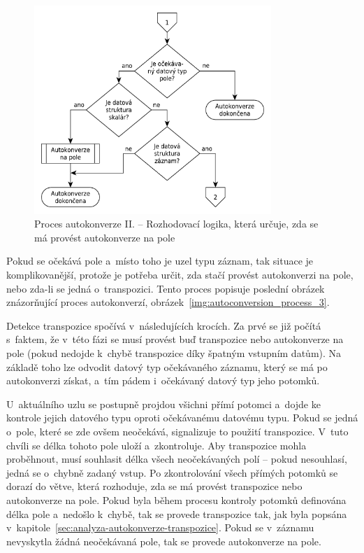 \documentclass[FM,bw,DP]{tulthesis}
\begin{document}
\begin{figure}[h]
	\centering
    \includegraphics[width=0.8\textwidth]{../img/autoconversion_process_2.pdf}
    \caption[Proces autokonverze II.]{Proces autokonverze II. -- Rozhodovací logika, která určuje, zda se má provést autokonverze na pole}
	\label{img:autoconversion_process_2}
\end{figure}

Pokud se očekává pole a~místo toho je uzel typu záznam, tak situace je komplikovanější, protože je potřeba určit, zda stačí provést autokonverzi na pole, nebo zda-li se jedná o~transpozici. Tento proces popisuje poslední obrázek znázorňující proces autokonverzí, obrázek~\ref{img:autoconversion_process_3}.

Detekce transpozice spočívá v~následujících krocích. Za prvé se již počítá s~faktem, že v~této fázi se musí provést buď transpozice nebo autokonverze na pole (pokud nedojde k~chybě transpozice díky špatným vstupním datům). Na základě toho lze odvodit datový typ očekávaného záznamu, který se má po autokonverzi získat, a~tím pádem i~očekávaný datový typ jeho potomků.

U~aktuálního uzlu se postupně projdou všichni přímí potomci a~dojde ke kontrole jejich datového typu oproti očekávanému datovému typu. Pokud se jedná o~pole, které se zde ovšem neočekává, signalizuje to použití transpozice. V~tuto chvíli se délka tohoto pole uloží a~zkontroluje. Aby transpozice mohla proběhnout, musí souhlasit délka všech neočekávaných polí -- pokud nesouhlasí, jedná se o~chybně zadaný vstup. Po zkontrolování všech přímých potomků se dorazí do větve, která rozhoduje, zda se má provést transpozice nebo autokonverze na pole. Pokud byla během procesu kontroly potomků definována délka pole a~nedošlo k~chybě, tak se provede transpozice tak, jak byla popsána v~kapitole~\ref{sec:analyza-autokonverze-transpozice}. Pokud se v~záznamu nevyskytla žádná neočekávaná pole, tak se provede autokonverze na pole.
\end{document}

